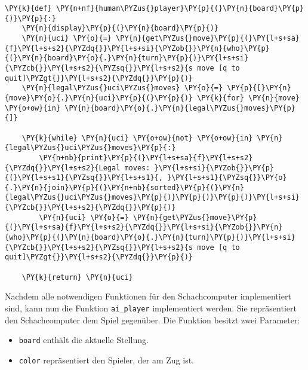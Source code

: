     \begin{tcolorbox}[fontupper=\linespread{.66}\selectfont, breakable, size=fbox, boxrule=1pt, pad at break*=1mm,colback=cellbackground, colframe=cellborder]
\begin{Verbatim}[commandchars=\\\{\}]
\PY{k}{def} \PY{n+nf}{human\PYZus{}player}\PY{p}{(}\PY{n}{board}\PY{p}{)}\PY{p}{:}
    \PY{n}{display}\PY{p}{(}\PY{n}{board}\PY{p}{)}
    \PY{n}{uci} \PY{o}{=} \PY{n}{get\PYZus{}move}\PY{p}{(}\PY{l+s+sa}{f}\PY{l+s+s2}{\PYZdq{}}\PY{l+s+si}{\PYZob{}}\PY{n}{who}\PY{p}{(}\PY{n}{board}\PY{o}{.}\PY{n}{turn}\PY{p}{)}\PY{l+s+si}{\PYZcb{}}\PY{l+s+s2}{\PYZsq{}}\PY{l+s+s2}{s move [q to quit]\PYZgt{}}\PY{l+s+s2}{\PYZdq{}}\PY{p}{)}
    \PY{n}{legal\PYZus{}uci\PYZus{}moves} \PY{o}{=} \PY{p}{[}\PY{n}{move}\PY{o}{.}\PY{n}{uci}\PY{p}{(}\PY{p}{)} \PY{k}{for} \PY{n}{move} \PY{o+ow}{in} \PY{n}{board}\PY{o}{.}\PY{n}{legal\PYZus{}moves}\PY{p}{]}

    \PY{k}{while} \PY{n}{uci} \PY{o+ow}{not} \PY{o+ow}{in} \PY{n}{legal\PYZus{}uci\PYZus{}moves}\PY{p}{:}
        \PY{n+nb}{print}\PY{p}{(}\PY{l+s+sa}{f}\PY{l+s+s2}{\PYZdq{}}\PY{l+s+s2}{Legal moves: }\PY{l+s+si}{\PYZob{}}\PY{p}{(}\PY{l+s+s1}{\PYZsq{}}\PY{l+s+s1}{, }\PY{l+s+s1}{\PYZsq{}}\PY{o}{.}\PY{n}{join}\PY{p}{(}\PY{n+nb}{sorted}\PY{p}{(}\PY{n}{legal\PYZus{}uci\PYZus{}moves}\PY{p}{)}\PY{p}{)}\PY{p}{)}\PY{l+s+si}{\PYZcb{}}\PY{l+s+s2}{\PYZdq{}}\PY{p}{)}
        \PY{n}{uci} \PY{o}{=} \PY{n}{get\PYZus{}move}\PY{p}{(}\PY{l+s+sa}{f}\PY{l+s+s2}{\PYZdq{}}\PY{l+s+si}{\PYZob{}}\PY{n}{who}\PY{p}{(}\PY{n}{board}\PY{o}{.}\PY{n}{turn}\PY{p}{)}\PY{l+s+si}{\PYZcb{}}\PY{l+s+s2}{\PYZsq{}}\PY{l+s+s2}{s move [q to quit]\PYZgt{}}\PY{l+s+s2}{\PYZdq{}}\PY{p}{)}

    \PY{k}{return} \PY{n}{uci}
\end{Verbatim}
\end{tcolorbox}

    Nachdem alle notwendigen Funktionen für den Schachcomputer implementiert
sind, kann nun die Funktion \texttt{ai\_player} implementiert werden.
Sie repräsentiert den Schachcomputer dem Spiel gegenüber. Die Funktion
besitzt zwei Parameter:

\begin{itemize}
\tightlist
\item
  \texttt{board} enthält die aktuelle Stellung.
\item
  \texttt{color} repräsentiert den Spieler, der am Zug ist.
\end{itemize}


